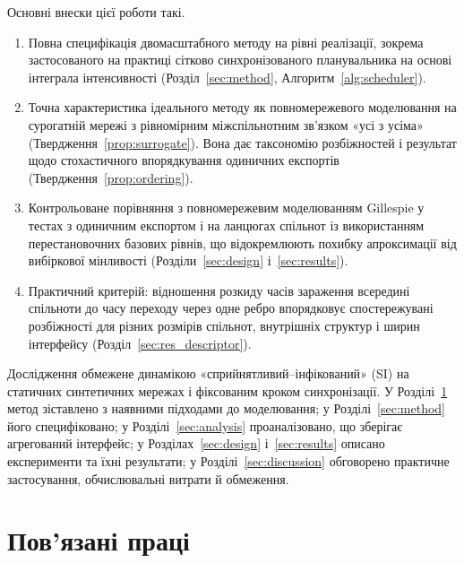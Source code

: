 Основні внески цієї роботи такі.
\begin{enumerate}
\item Повна специфікація двомасштабного методу на рівні реалізації, зокрема застосованого на практиці сітково синхронізованого планувальника на основі інтеграла інтенсивності (Розділ~\ref{sec:method}, Алгоритм~\ref{alg:scheduler}).
\item Точна характеристика ідеального методу як повномережевого моделювання на сурогатній мережі з рівномірним міжспільнотним зв'язком «усі з усіма» (Твердження~\ref{prop:surrogate}). Вона дає таксономію розбіжностей і результат щодо стохастичного впорядкування одиничних експортів (Твердження~\ref{prop:ordering}).
\item Контрольоване порівняння з повномережевим моделюванням Gillespie у тестах з одиничним експортом і на ланцюгах спільнот із використанням перестановочних базових рівнів, що відокремлюють похибку апроксимації від вибіркової мінливості (Розділи~\ref{sec:design} і~\ref{sec:results}).
\item Практичний критерій: відношення розкиду часів зараження всередині спільноти до часу переходу через одне ребро впорядковує спостережувані розбіжності для різних розмірів спільнот, внутрішніх структур і ширин інтерфейсу (Розділ~\ref{sec:res_descriptor}).
\end{enumerate}

Дослідження обмежене динамікою «сприйнятливий--інфікований» (SI) на статичних синтетичних мережах і фіксованим кроком синхронізації. У Розділі~\ref{sec:related} метод зіставлено з наявними підходами до моделювання; у Розділі~\ref{sec:method} його специфіковано; у Розділі~\ref{sec:analysis} проаналізовано, що зберігає агрегований інтерфейс; у Розділах~\ref{sec:design} і~\ref{sec:results} описано експерименти та їхні результати; у Розділі~\ref{sec:discussion} обговорено практичне застосування, обчислювальні витрати й обмеження.

\section{Пов'язані праці}
\label{sec:related}

